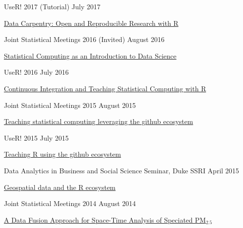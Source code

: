 \documentclass[margin,line]{res}
\begin{document}
\begin{resume}
UseR! 2017 (Tutorial) \hfill July 2017
\begin{list1}
\item[] \href{https://github.com/fmichonneau/2017-useR-reproducibility/}{Data Carpentry: Open and Reproducible Research with R}
\end{list1}
\vspace{-3mm}

Joint Statistical Meetings 2016 (Invited) \hfill August 2016
\begin{list1}
\item[] \href{https://github.com/rundel/Presentations/tree/master/JSM%202016}{Statistical Computing as an Introduction to Data Science}
\end{list1}
\vspace{-3mm}

UseR! 2016 \hfill July 2016
\begin{list1}
\item[] \href{https://github.com/rundel/Presentations/tree/master/UseR2016}{Continuous Integration and Teaching Statistical Computing with R}
\end{list1}
\vspace{-3mm}


Joint Statistical Meetings 2015 \hfill August 2015
\begin{list1}
\item[] \href{https://github.com/rundel/Presentations/tree/master/JSM%202015}{Teaching statistical computing leveraging the github ecosystem}
\end{list1}
\vspace{-3mm}

UseR! 2015 \hfill July 2015
\begin{list1}
\item[] \href{https://github.com/rundel/Presentations/tree/master/UseR2015}{Teaching R using the github ecosystem}
\end{list1}
\vspace{-3mm}


Data Analytics in Business and Social Science Seminar, Duke SSRI \hfill April 2015
\begin{list1}
\item[] \href{https://github.com/rundel/Presentations/tree/master/Duke%202015%20-%20DABSS}{Geospatial data and the R ecosystem}
\end{list1}
\vspace{-3mm}

Joint Statistical Meetings 2014 \hfill August 2014
\begin{list1}
\item[] \href{https://github.com/rundel/Presentations/tree/master/JSM%202014}{A Data Fusion Approach for Space-Time Analysis of Speciated PM$_{2.5}$}
\end{list1}
\vspace{-3mm}


\end{resume}
\end{document}
